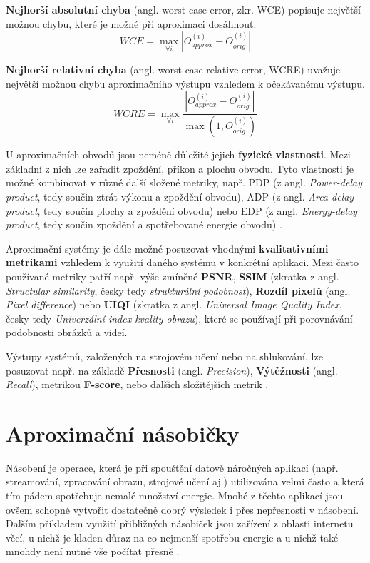 \textbf{Nejhorší absolutní chyba} (angl. worst-case error, zkr. WCE) popisuje největší možnou chybu, které je možné při aproximaci dosáhnout.
\begin{equation}
    WCE = \max_{\forall i} \left|{O_{approx}^{(i)} - O_{orig}^{(i)}}\right|
\end{equation}

\textbf{Nejhorší relativní chyba} (angl. worst-case relative error, WCRE) uvažuje největší možnou chybu aproximačního výstupu vzhledem k očekávanému výstupu.
\begin{equation}
    WCRE = \max_{\forall i} \frac{\left|{O_{approx}^{(i)} - O_{orig}^{(i)}}\right|} {\max(1,O_{orig}^{(i)})} 
\end{equation}

\bigskip

U aproximačních obvodů jsou neméně důležité jejich \textbf{fyzické vlastnosti}. Mezi základní z nich lze zařadit zpoždění, příkon a plochu obvodu. Tyto vlastnosti je možné kombinovat v různé další složené metriky, např. PDP (z angl. \textit{Power-delay product}, tedy součin ztrát výkonu a zpoždění obvodu), ADP (z angl. \textit{Area-delay product}, tedy součin plochy a zpoždění obvodu) nebo EDP (z angl. \textit{Energy-delay product}, tedy součin zpoždění a spotřebované energie obvodu) \cite{approx_arith_circuits}.

\bigskip

Aproximační systémy je dále možné posuzovat vhodnými \textbf{kvalitativními metrikami} vzhledem k využití daného systému v konkrétní aplikaci. Mezi často používané metriky \cite{ac_techniques} patří např. výše zmíněné \textbf{PSNR}, \textbf{SSIM} (zkratka z angl. \textit{Structular similarity}, česky tedy \textit{strukturální podobnost}), \textbf{Rozdíl pixelů} (angl. \textit{Pixel difference}) nebo \textbf{UIQI} (zkratka z angl. \textit{Universal Image Quality Index}, česky tedy \textit{Univerzální index kvality obrazu}), které se používají při porovnávání podobnosti obrázků a videí.

Výstupy systémů, založených na strojovém učení nebo na shlukování, lze posuzovat např. na základě \textbf{Přesnosti} (angl. \textit{Precision}), \textbf{Výtěžnosti} (angl. \textit{Recall}), metrikou \textbf{F-score}, nebo dalších složitějších metrik \cite{clustering_eval}.

\section{Aproximační násobičky} \label{approx_mult}
Násobení je operace, která je při spouštění datově náročných aplikací (např. streamování, zpracování obrazu, strojové učení aj.) utilizována velmi často a která tím pádem spotřebuje nemalé množství energie. Mnohé z těchto aplikací jsou ovšem schopné vytvořit dostatečně dobrý výsledek i přes nepřesnosti v násobení. Dalším příkladem využití přibližných násobiček jsou zařízení z oblasti internetu věcí, u nichž je kladen důraz na co nejmenší spotřebu energie a u nichž také mnohdy není nutné vše počítat přesně \cite{approx_mult_survey}.

